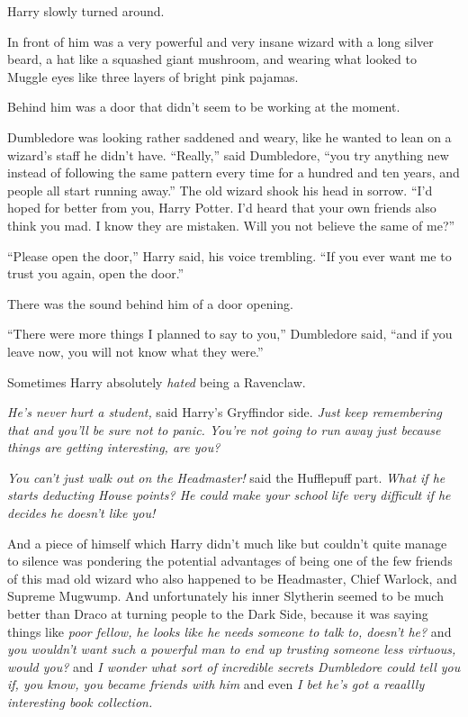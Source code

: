 Harry slowly turned around.

In front of him was a very powerful and very insane wizard with a long silver beard, a hat like a squashed giant mushroom, and wearing what looked to Muggle eyes like three layers of bright pink pajamas.

Behind him was a door that didn’t seem to be working at the moment.

Dumbledore was looking rather saddened and weary, like he wanted to lean on a wizard’s staff he didn’t have. “Really,” said Dumbledore, “you try anything new instead of following the same pattern every time for a hundred and ten years, and people all start running away.” The old wizard shook his head in sorrow. “I’d hoped for better from you, Harry Potter. I’d heard that your own friends also think you mad. I know they are mistaken. Will you not believe the same of me?”

“Please open the door,” Harry said, his voice trembling. “If you ever want me to trust you again, open the door.”

There was the sound behind him of a door opening.

“There were more things I planned to say to you,” Dumbledore said, “and if you leave now, you will not know what they were.”

Sometimes Harry absolutely \emph{hated} being a Ravenclaw.

\emph{He’s never hurt a student,} said Harry’s Gryffindor side. \emph{Just keep remembering that and you’ll be sure not to panic. You’re not going to run away just because things are getting interesting, are you?}

\emph{You can’t just walk out on the Headmaster!} said the Hufflepuff part. \emph{What if he starts deducting House points? He could make your school life very difficult if he decides he doesn’t like you!}

And a piece of himself which Harry didn’t much like but couldn’t quite manage to silence was pondering the potential advantages of being one of the few friends of this mad old wizard who also happened to be Headmaster, Chief Warlock, and Supreme Mugwump. And unfortunately his inner Slytherin seemed to be much better than Draco at turning people to the Dark Side, because it was saying things like \emph{poor fellow, he looks like he needs someone to talk to, doesn’t he?} and \emph{you wouldn’t want such a powerful man to end up trusting someone less virtuous, would you?} and \emph{I wonder what sort of incredible secrets Dumbledore could tell you if, you know, you became friends with him} and even \emph{I bet he’s got a reaallly interesting book collection.}

